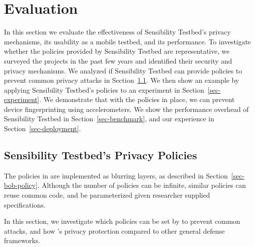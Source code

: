 \section{Evaluation}\label{sec-eval}

In this section we evaluate the effectiveness of Sensibility Testbed's 
privacy mechanisms, its usability as a mobile testbed, and its 
performance. To investigate whether the policies provided by 
Sensibility Testbed are representative, we surveyed the projects
in the past few years and identified their security and privacy 
mechanisms. We analyzed if Sensibility Testbed can provide policies 
to prevent common privacy attacks in Section~\ref{sec-our-policies}. 
We then show an example by applying Sensibility Testbed's 
policies to an experiment in Section~\ref{sec-experiment}. We 
demonstrate that with the policies in place, we can prevent device
fingerprinting using accelerometers. We show the performance overhead of 
Sensibility Testbed in Section~\ref{sec-benchmark}, and our 
experience in Section~\ref{sec-deployment}.

\subsection{Sensibility Testbed's Privacy Policies}\label{sec-our-policies}

The policies in \sysname are implemented as blurring layers, as described
in Section~\ref{sec-bob-policy}. Although the number of policies can be
infinite, similar policies can reuse common code, and be parameterized 
given researcher supplied specifications. 

In this section, we investigate which policies can be set by \sysname to 
prevent common attacks, and how \sysname's privacy protection compared 
to other general defense frameworks.


